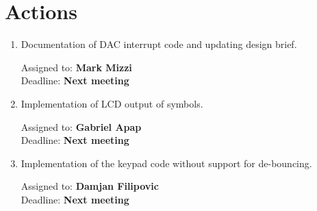 \documentclass[11pt,a4paper]{scrartcl}
\begin{document}
\section*{Actions}

\begin{enumerate}

\item Documentation of DAC interrupt code and updating design brief.
\begin{flushright}
Assigned to: \textbf{Mark Mizzi} \\
Deadline: \textbf{Next meeting}
\end{flushright}

\item Implementation of LCD output of symbols.
\begin{flushright}
Assigned to: \textbf{Gabriel Apap} \\
Deadline: \textbf{Next meeting}
\end{flushright}

\item Implementation of the keypad code without support for de-bouncing.
\begin{flushright}
Assigned to: \textbf{Damjan Filipovic} \\
Deadline: \textbf{Next meeting}
\end{flushright}


\end{enumerate}
\end{document}

